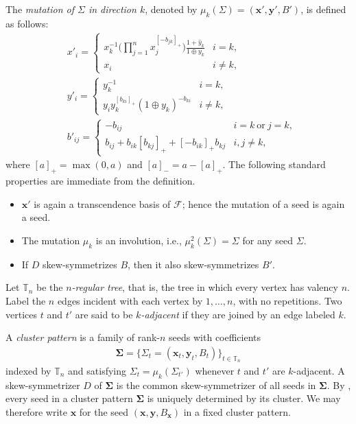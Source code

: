 \documentclass[11pt,reqno]{amsart}
\theoremstyle{plain}
\theoremstyle{definition}
\numberwithin{equation}{section}
\newcommand\hua{\mathcal}
\newcommand\<{\langle}
\renewcommand\>{\rangle}
\def\seed{\Sigma}
\def\seeds{\mathbf{\Sigma}}
\def\xx{\mathbf{x}}%
\def\yy{\mathbf{y}}%
\newcommand{\pos}[1]{[#1]_+}
\newcommand{\nega}[1]{[#1]_-}
\def\regT{\mathbb{T}}%
\begin{document}
The \emph{mutation of $\seed$ in direction $k$}, denoted by $\mu_k(\seed)=(\xx',\yy',B')$, is defined as follows:
\begin{align}
&x'_i=
\begin{cases}\label{eq:mutx}
x_k^{-1} \Big( \prod_{j=1}^n x_j^{\pos{-b_{jk}}} \Big) \displaystyle{\frac{1 + \hat{y}_k}{1 \oplus y_k}} & i=k,\\
x_i & i\ne k,
\end{cases}
\\
&y'_i=
\begin{cases}
y_k^{-1} & i=k,\\
y_i y_k^{\pos{b_{ki}}}(1 \oplus y_k)^{-b_{ki}} & i\ne k,
\end{cases}
\\
&b'_{ij}=
\begin{cases}
-b_{ij} & i=k~\text{or}~j=k,\\
b_{ij}+b_{ik}\pos{b_{kj}}+\pos{-b_{ik}}b_{kj} & i,j\ne k,
\end{cases}
\end{align}
where $\pos{a}=\max(0,a)$ and $\nega{a}=a-\pos{a}$.
The following standard properties are immediate from the definition.
\begin{itemize}
    \item $\xx'$ is again a transcendence basis of $\hua{F}$; hence the mutation of a seed is again a seed.
    \item The mutation $\mu_k$ is an involution, i.e., $\mu_k^2(\seed)=\seed$ for any seed $\seed$.
    \item If $D$ skew-symmetrizes $B$, then it also skew-symmetrizes $B'$.
\end{itemize}

Let $\regT_n$ be the \emph{$n$-regular tree}, that is, the tree in which every vertex has valency $n$. Label the $n$ edges incident with each vertex by $1,\ldots,n$, with no repetitions. Two vertices $t$ and $t'$ are said to be \emph{$k$-adjacent} if they are joined by an edge labeled $k$.

A \emph{cluster pattern} is a family of rank-$n$ seeds with coefficients
\begin{gather}\label{eq:cpattern}
    \seeds=\{ \seed_t=(\xx_t,\yy_t,B_t) \}_{ t\in\regT_n }
\end{gather}
indexed by $\regT_n$ and satisfying $\seed_t=\mu_k(\seed_{t'})$ whenever $t$ and $t'$ are $k$-adjacent.
A skew-symmetrizer $D$ of $\seeds$ is the common skew-symmetrizer of all seeds in $\seeds$.
By \cite[Prop.~3]{CL2}, every seed in a cluster pattern $\seeds$ is uniquely determined by its cluster. We may therefore write $\xx$ for the seed $(\xx,\yy,B_\xx)$ in a fixed cluster pattern.
\end{document}
